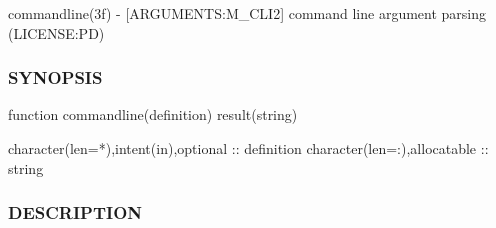 commandline(3f) -\/ \mbox{[}A\+R\+G\+U\+M\+E\+N\+TS\+:M\+\_\+\+C\+L\+I2\mbox{]} command line argument parsing (L\+I\+C\+E\+N\+SE\+:PD) 

\subsubsection*{S\+Y\+N\+O\+P\+S\+IS}

\begin{DoxyVerb} function commandline(definition) result(string)

  character(len=*),intent(in),optional  :: definition
  character(len=:),allocatable :: string
\end{DoxyVerb}
 \subsubsection*{D\+E\+S\+C\+R\+I\+P\+T\+I\+ON}

